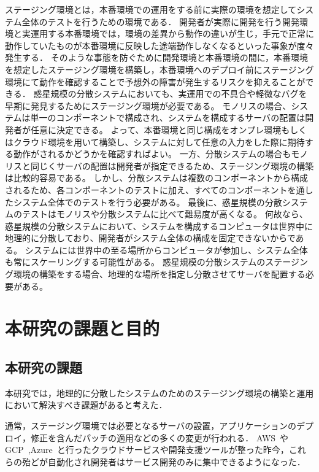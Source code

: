 ステージング環境とは，本番環境での運用をする前に実際の環境を想定してシステム全体のテストを行うための環境である．
開発者が実際に開発を行う開発環境と実運用する本番環境では，環境の差異から動作の違いが生じ，手元で正常に動作していたものが本番環境に反映した途端動作しなくなるといった事象が度々発生する．
そのような事態を防ぐために開発環境と本番環境の間に，本番環境を想定したステージング環境を構築し，本番環境へのデプロイ前にステージング環境にて動作を確認することで予想外の障害が発生するリスクを抑えることができる．
惑星規模の分散システムにおいても、実運用での不具合や軽微なバグを早期に発見するためにステージング環境が必要である。
モノリスの場合、システムは単一のコンポーネントで構成され、システムを構成するサーバの配置は開発者が任意に決定できる。
よって、本番環境と同じ構成をオンプレ環境もしくはクラウド環境を用いて構築し、システムに対して任意の入力をした際に期待する動作がされるかどうかを確認すればよい。
一方、分散システムの場合もモノリスと同じくサーバの配置は開発者が指定できるため、ステージング環境の構築は比較的容易である。
しかし、分散システムは複数のコンポーネントから構成されるため、各コンポーネントのテストに加え、すべてのコンポーネントを通したシステム全体でのテストを行う必要がある。
最後に、惑星規模の分散システムのテストはモノリスや分散システムに比べて難易度が高くなる。
何故なら、惑星規模の分散システムにおいて、システムを構成するコンピュータは世界中に地理的に分散しており、開発者がシステム全体の構成を固定できないからである。
システムには世界中の至る場所からコンピュータが参加し、システム全体も常にスケーリングする可能性がある。
惑星規模の分散システムのステージング環境の構築をする場合、地理的な場所を指定し分散させてサーバを配置する必要がある。

\section{本研究の課題と目的}

\subsection{本研究の課題}
\label{introduction:issue-and-aim:issue}

本研究では，地理的に分散したシステムのためのステージング環境の構築と運用において解決すべき課題があると考えた．

通常，ステージング環境では必要となるサーバの設置，アプリケーションのデプロイ，修正を含んだパッチの適用などの多くの変更が行われる．
AWS~\cite{AWS}やGCP~\cite{GCP},Azure~\cite{Azure}と行ったクラウドサービスや開発支援ツールが整った昨今，これらの殆どが自動化され開発者はサービス開発のみに集中できるようになった．

